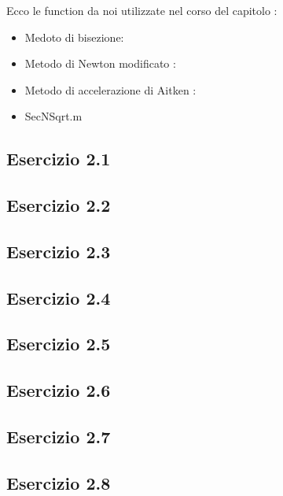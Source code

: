 Ecco le function da noi utilizzate nel corso del capitolo :

\begin{itemize}

\item Medoto di bisezione:


\item Metodo di Newton modificato :


\item Metodo di accelerazione di Aitken :


\item SecNSqrt.m


\end{itemize}

\subsection{\textbf{Esercizio 2.1}}

\subsection{\textbf{Esercizio 2.2}}

\subsection{\textbf{Esercizio 2.3}}

\subsection{\textbf{Esercizio 2.4}}

\subsection{\textbf{Esercizio 2.5}}

\subsection{\textbf{Esercizio 2.6}}

\subsection{\textbf{Esercizio 2.7}}

\subsection{\textbf{Esercizio 2.8}}

